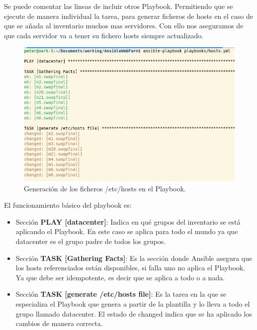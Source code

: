 Se puede comentar las lineas de incluir otros Playbook. Permitiendo que se ejecute de manera individual la tarea, para generar ficheros de hosts en el caso de que se añada al inventario muchos mas servidores. Con ello nos aseguramos de que cada servidor va a tener su fichero hosts siempre actualizado.



\begin{figure}[H]
	\centering
	\includegraphics[scale=0.35]{img/ansible1}
	\caption{Generación de los ficheros /etc/hosts en el Playbook.}
\end{figure}

El funcionamiento básico del playbook es:

\begin{itemize}
	\item Sección \textbf{PLAY [datacenter]}: Indica en qué grupos del inventario se está aplicando el Playbook. En este caso se aplica para todo el mundo ya que datacenter es el grupo padre de todos los grupos.
	\item Sección \textbf{TASK [Gathering Facts]}: Es la sección donde Ansible asegura que los hosts referenciados están disponibles, si falla uno no aplica el Playbook. Ya que debe ser idempotente, es decir que se aplica a todo o a nada.
	\item Sección \textbf{TASK [generate /etc/hosts file]}: Es la tarea en la que se especializa el Playbook que genera a partir de la plantilla y lo lleva a todo el grupo llamado datacenter. El estado de changed indica que se ha aplicado los cambios de manera correcta.
\end{itemize}

